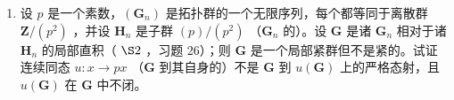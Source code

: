 \begin{enumerate}
\def\labelenumi{\arabic{enumi})}
\setcounter{enumi}{22}
\tightlist
\item
  设 \(p\) 是一个素数，\((\mathbf{G}_n)\) 是拓扑群的一个无限序列，每个都等同于离散群 \(\mathbf{Z}/(p^2)\) ，并设 \(\mathbf{H}_n\) 是子群 \((p) / (p^2)\) （\(\mathbf{G}_n\) 的）。设 \(\mathbf{G}\) 是诸 \(\mathbf{G}_n\) 相对于诸 \(\mathbf{H}_n\) 的局部直积（ \(\S 2\) ，习题 26）；则 \(\mathbf{G}\) 是一个局部紧群但不是紧的。试证连续同态 \(u: x \to px\) （\(\mathbf{G}\) 到其自身的）不是 \(\mathbf{G}\) 到 \(u(\mathbf{G})\) 上的严格态射，且 \(u(\mathbf{G})\) 在 \(\mathbf{G}\) 中不闭。
\end{enumerate}
